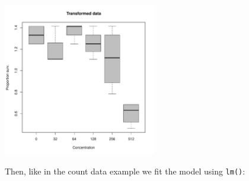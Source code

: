\begin{knitrout}
\color{fgcolor}\begin{kframe}
\begin{alltt}
 \hlopt{~}   
         \hlstd{=} \hlstd{,}  \hlstd{=} \hlstd{,}
         \hlstd{=} \hlstd{,}  \hlstd{=} \hlstd{)}
\end{alltt}
\end{kframe}

{\centering \includegraphics[width=0.5\textwidth]{appendix/usetheglm/two/bin_trans_plot-1} 

}



\end{knitrout}


Then, like in the count data example we fit the model using \texttt{lm()}:
\begin{knitrout}
\color{fgcolor}\begin{kframe}
\begin{alltt}
 \hlkwb{<-}  \hlopt{~}   
\end{alltt}
\end{kframe}
\end{knitrout}

